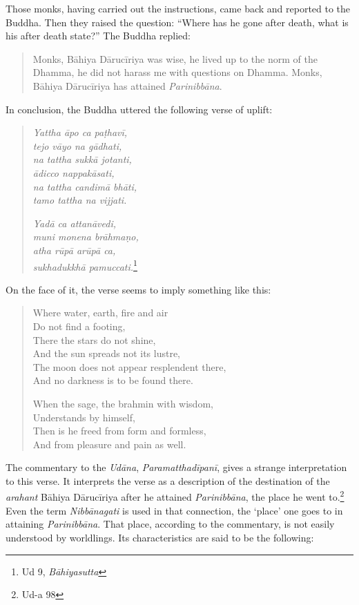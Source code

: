 Those monks, having carried out the instructions, came back and reported to the Buddha. Then they raised the question: ``Where has he gone after death, what is his after death state?'' The Buddha replied:

\begin{quote}
Monks, Bāhiya Dārucīriya was wise, he lived up to the norm of the Dhamma, he did not harass me with questions on Dhamma. Monks, Bāhiya Dārucīriya has attained \emph{Parinibbāna}.
\end{quote}

In conclusion, the Buddha uttered the following verse of uplift:

\begin{quote}
\emph{Yattha āpo ca paṭhavī,}\\
\emph{tejo vāyo na gādhati,}\\
\emph{na tattha sukkā jotanti,}\\
\emph{ādicco nappakāsati,}\\
\emph{na tattha candimā bhāti,}\\
\emph{tamo tattha na vijjati.}

\emph{Yadā ca attanāvedi,}\\
\emph{muni monena brāhmaṇo,}\\
\emph{atha rūpā arūpā ca,}\\
\emph{sukhadukkhā pamuccati.}\footnote{Ud 9, \emph{Bāhiyasutta}}
\end{quote}

On the face of it, the verse seems to imply something like this:

\begin{quote}
Where water, earth, fire and air\\
Do not find a footing,\\
There the stars do not shine,\\
And the sun spreads not its lustre,\\
The moon does not appear resplendent there,\\
And no darkness is to be found there.

When the sage, the brahmin with wisdom,\\
Understands by himself,\\
Then is he freed from form and formless,\\
And from pleasure and pain as well.
\end{quote}

The commentary to the \emph{Udāna}, \emph{Paramatthadīpanī}, gives a strange interpretation to this verse. It interprets the verse as a description of the destination of the \emph{arahant} Bāhiya Dārucīriya after he attained \emph{Parinibbāna}, the place he went to.\footnote{Ud-a 98} Even the term \emph{Nibbānagati} is used in that connection, the `place' one goes to in attaining \emph{Parinibbāna}. That place, according to the commentary, is not easily understood by worldlings. Its characteristics are said to be the following:

